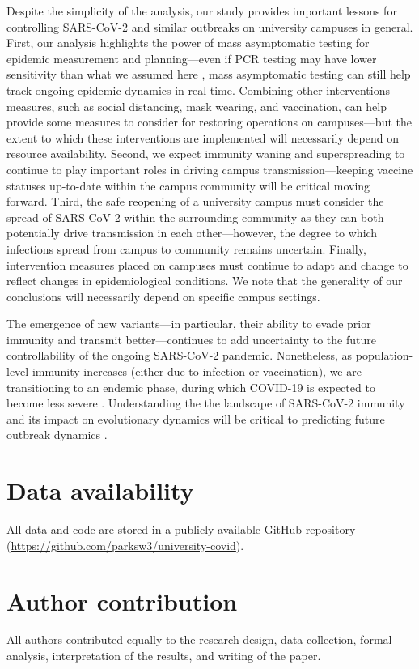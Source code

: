 \documentclass[12pt]{article}
\begin{document}
Despite the simplicity of the analysis, our study provides important lessons for controlling SARS-CoV-2 and similar outbreaks on university campuses in general.
First, our analysis highlights the power of mass asymptomatic testing for epidemic measurement and planning---even if PCR testing may have lower sensitivity than what we assumed here \citep{hellewell2021estimating}, mass asymptomatic testing can still help track ongoing epidemic dynamics in real time.
Combining other interventions measures, such as social distancing, mask wearing, and vaccination, can help provide some measures to consider for restoring operations on campuses---but the extent to which these interventions are implemented will necessarily depend on resource availability.
Second, we expect immunity waning and superspreading to continue to play important roles in driving campus transmission---keeping vaccine statuses up-to-date within the campus community will be critical moving forward.
Third, the safe reopening of a university campus must consider the spread of SARS-CoV-2 within the surrounding community as they can both potentially drive transmission in each other---however, the degree to which infections spread from campus to community remains uncertain.
Finally, intervention measures placed on campuses must continue to adapt and change to reflect changes in epidemiological conditions.
We note that the generality of our conclusions will necessarily depend on specific campus settings.

The emergence of new variants---in particular, their ability to evade prior immunity and transmit better---continues to add uncertainty to the future controllability of the ongoing SARS-CoV-2 pandemic.
Nonetheless, as population-level immunity increases (either due to infection or vaccination), we are transitioning to an endemic phase, during which COVID-19 is expected to become less severe \citep{lavine2021immunological}.
Understanding the the landscape of SARS-CoV-2 immunity and its impact on evolutionary dynamics will be critical to predicting future outbreak dynamics \citep{saad2020immune,baker2021limits}.

\section*{Data availability}

All data and code are stored in a publicly available GitHub repository (\url{https://github.com/parksw3/university-covid}).

\section*{Author contribution}

All authors contributed equally to the research design, data collection, formal analysis, interpretation of the results, and writing of the paper.


\end{document}
